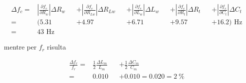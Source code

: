 \documentclass[12pt,italian]{article}
\begin{document}
\begin{equation*}
	\begin{alignedat}{5}
		\Delta f_{c} = & \left|\frac{\partial f_{c}}{\partial R_{w}}\right| \Delta R_{w} &  & +  \left|\frac{\partial f_{c}}{\partial R_{Lw}}\right| \Delta R_{Lw} &  & + \left|\frac{\partial f_{c}}{\partial L_{w}}\right| \Delta L_{w} &  & + \left|\frac{\partial f_{c}}{\partial R_{t}}\right| \Delta R_{t} &  & + \left|\frac{\partial f_{c}}{\partial C_{t}}\right| \Delta C_{t} \\
		=              & ( 5.31                                                          &  & +  4.97                                                              &  & + 6.71                                                            &  & + 9.57                                                            &  & + 16.2 ) \text{ Hz}                                               \\
		=              & 43 \text{ Hz}
	\end{alignedat}
\end{equation*}

\noindent
mentre per $f_{r}$ risulta

\begin{equation*}
	\begin{alignedat}{2}
		\frac{\Delta f_{r}}{f_{r}} = & \frac{1}{2} \frac{\Delta L_{m}}{L_{m}} &  & + \frac{1}{2} \frac{\Delta C_{m}}{C_{m}} \\
		=                            & 0.010                                  &  & + 0.010
		= 0.020 = 2 \ \%
	\end{alignedat}
\end{equation*}
\end{document}
